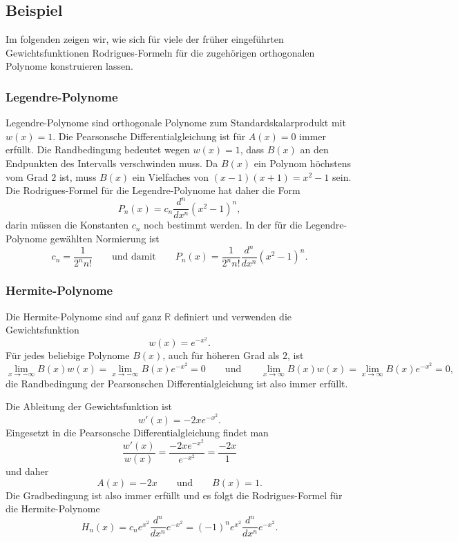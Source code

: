 \subsection{Beispiel}
Im folgenden zeigen wir, wie sich für viele der früher eingeführten
Gewichtsfunktionen Rodrigues-Formeln für die zugehörigen orthogonalen
Polynome konstruieren lassen.

%
%
\subsubsection{Legendre-Polynome}
Legendre-Polynome sind orthogonale Polynome zum Standardskalarprodukt
mit $w(x)=1$.
Die Pearsonsche Differentialgleichung ist für $A(x)=0$ immer erfüllt.
Die Randbedingung bedeutet wegen $w(x)=1$, dass $B(x)$ an den
Endpunkten des Intervalls verschwinden muss.
Da $B(x)$ ein Polynom höchstens vom Grad $2$ ist, muss $B(x)$ ein
Vielfaches von $(x-1)(x+1)=x^2-1$ sein.
Die Rodrigues-Formel für die Legendre-Polynome hat daher die Form
\[
P_n(x)
=
c_n
\frac{d^n}{dx^n}
(x^2-1)^n,
\]
darin müssen die Konstanten $c_n$ noch bestimmt werden.
In der für die Legendre-Polynome gewählten Normierung ist
\[
c_n = \frac1{2^n n!}
\qquad\text{und damit}\qquad
P_n(x)
=
\frac{1}{2^nn!}
\frac{d^n}{dx^n}
(x^2-1)^n.
\]

%
%
\subsubsection{Hermite-Polynome}
Die Hermite-Polynome sind auf ganz $\mathbb{R}$ definiert und verwenden
die Gewichtsfunktion
\[
w(x) = e^{-x^2}.
\]
Für jedes beliebige Polynome $B(x)$, auch für höheren Grad als $2$, ist
\[
\lim_{x\to-\infty} B(x) w(x)
=
\lim_{x\to-\infty} B(x)e^{-x^2}
=
0
\qquad\text{und}\qquad
\lim_{x\to\infty} B(x) w(x)
=
\lim_{x\to\infty} B(x)e^{-x^2}
=
0,
\]
die Randbedingung der Pearsonschen Differentialgleichung ist also
immer erfüllt.

Die Ableitung der Gewichtsfunktion ist
\[
w'(x) = -2xe^{-x^2}.
\]
Eingesetzt in die Pearsonsche Differentialgleichung findet man
\[
\frac{w'(x)}{w(x)}
=
\frac{-2xe^{-x^2}}{e^{-x^2}}
=
\frac{-2x}{1}
\]
und daher
\[
A(x) = -2x
\qquad\text{und}\qquad
B(x) = 1.
\]
Die Gradbedingung ist also immer erfüllt und es folgt die Rodrigues-Formel
für die Hermite-Polynome
%
%
\begin{equation}
H_n(x)
=
c_n
e^{x^2}\frac{d^n}{dx^n} e^{-x^2}
=
(-1)^n
e^{x^2}\frac{d^n}{dx^n} e^{-x^2}.
\label{buch:orthogonal:eqn:hermite-rodrigues}
\end{equation}


